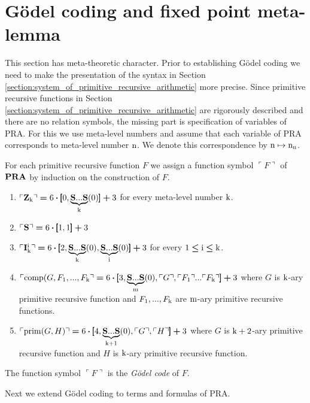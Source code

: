 \documentclass[10pt]{amsart}
\newcommand{\godel}[1]{\ulcorner #1 \urcorner}
\newcommand{\mleq}{\boldsymbol{\leq}}
\newcommand{\meq}{\boldsymbol{=}}
\newcommand{\mplus}{\boldsymbol{+}}
\newcommand{\mdot}{\boldsymbol{\cdot}}
\begin{document}
\section{G{\"o}del coding and fixed point meta-lemma}
\noindent
This section has meta-theoretic character. Prior to establishing G{\"o}del coding we need to make the presentation of the syntax in Section \ref{section:system_of_primitive_recursive_arithmetic} more precise. Since primitive recursive functions in Section \ref{section:system_of_primitive_recursive_arithmetic} are rigorously described and there are no relation symbols, the missing part is specification of variables of $\mathrm{PRA}$. For this we use meta-level numbers and assume that each variable of $\mathrm{PRA}$ corresponds to meta-level number $\rm{n}$. We denote this correspondence by $\rm{n} \mapsto n_{\rm{n}}$.

\begin{definition}
	For each primitive recursive function $F$ we assign a function symbol $\godel{F}$ of $\mathbf{PRA}$ by induction on the construction of $F$.
	\begin{enumerate}[label=\textbf{(\arabic*)}, leftmargin=3.0em]
		\item $\godel{\bd{Z}_{\rm{k}}} \meq 6\mdot \pmb{[}0,\underbrace{\bd{S}...\bd{S}}_{\rm{k}}(0)\pmb{]} \mplus 3$ for every meta-level number $\rm{k}$.
		\item $\godel{\bd{S}} \meq 6\mdot \pmb{[}1,1\pmb{]} \mplus 3$
		\item $\godel{\bd{I}^{\rm{i}}_{\rm{k}}} \meq 6\mdot \pmb{[}2,\underbrace{\bd{S}...\bd{S}}_{\rm{k}}(0),\underbrace{\bd{S}...\bd{S}}_{\rm{i}}(0)\pmb{]} \mplus 3$ for every $\rm{1} \mleq \rm{i} \mleq \rm{k}$.
		\item $\godel{\mathrm{comp}(G,F_{\rm{1}},...,F_{\rm{k}}} \meq 6\mdot \pmb{[}3,\underbrace{\bd{S}...\bd{S}}_{\rm{m}}(0),\godel{G}, \godel{F_{\rm{1}}}...\godel{F_{\rm{k}}}\pmb{]} \mplus 3$ where $G$ is $\rm{k}$-ary primitive recursive function and $F_{\rm{1}},...,F_{\rm{k}}$ are $\rm{m}$-ary primitive recursive functions.
		\item  $\godel{\mathrm{prim}(G,H)} \meq 6\mdot \pmb{[}4,\underbrace{\bd{S}...\bd{S}}_{\rm{k + 1}}(0),\godel{G},\godel{H}\pmb{]} \mplus 3$ where $G$ is $\rm{k + 2}$-ary primitive recursive function and $H$ is $\rm{k}$-ary primitive recursive function.
	\end{enumerate}
	The function symbol $\godel{F}$ is the \textit{G{\"o}del code} of $F$.
\end{definition}
\noindent
Next we extend G{\"o}del coding to terms and formulas of $\mathrm{PRA}$.
\end{document}

